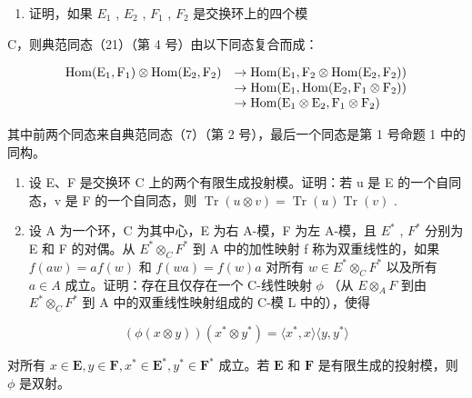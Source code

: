 \begin{enumerate}
\def\labelenumi{\arabic{enumi}.}
\setcounter{enumi}{6}
\tightlist
\item
  证明，如果 \(E_{1}\) , \(E_{2}\) , \(F_{1}\) , \(F_{2}\) 是交换环上的四个模
\end{enumerate}

C，则典范同态（21）（第 4 号）由以下同态复合而成：

\[
\begin{array}{r l} \operatorname{Hom} (\mathrm{E} _ {1}, \mathrm{F} _ {1}) \otimes \operatorname{Hom} (\mathrm{E} _ {2}, \mathrm{F} _ {2}) & \to \operatorname{Hom} (\mathrm{E} _ {1}, \mathrm{F} _ {2} \otimes \operatorname{Hom} (\mathrm{E} _ {2}, \mathrm{F} _ {2})) \\ & \to \operatorname{Hom} (\mathrm{E} _ {1}, \operatorname{Hom} (\mathrm{E} _ {2}, \mathrm{F} _ {1} \otimes \mathrm{F} _ {2})) \\ & \to \operatorname{Hom} (\mathrm{E} _ {1} \otimes \mathrm{E} _ {2}, \mathrm{F} _ {1} \otimes \mathrm{F} _ {2}) \end{array}
\]

其中前两个同态来自典范同态（7）（第 2 号），最后一个同态是第 1 号命题 1 中的同构。

\begin{enumerate}
\def\labelenumi{\arabic{enumi}.}
\setcounter{enumi}{7}
\item
  设 E、F 是交换环 C 上的两个有限生成投射模。证明：若 u 是 E 的一个自同态，v 是 F 的一个自同态，则 \(\operatorname{Tr}(u \otimes v) = \operatorname{Tr}(u)\operatorname{Tr}(v)\) .
\item
  设 A 为一个环，C 为其中心，E 为右 A-模，F 为左 A-模，且 \(E^{*}\) , \(F^{*}\) 分别为 E 和 F 的对偶。从 \(E^{*} \otimes_{C} F^{*}\) 到 A 中的加性映射 f 称为双重线性的，如果 \(f(aw) = af(w)\) 和 \(f(wa) = f(w)a\) 对所有 \(w \in E^{*} \otimes_{C} F^{*}\) 以及所有 \(a \in A\) 成立。证明：存在且仅存在一个 C-线性映射 \(\phi\) （从 \(E \otimes_{A} F\) 到由 \(E^{*} \otimes_{C} F^{*}\) 到 A 中的双重线性映射组成的 C-模 L 中的），使得
\end{enumerate}

\[
(\phi (x \otimes y)) (x ^ {*} \otimes y ^ {*}) = \langle x ^ {*}, x \rangle \langle y, y ^ {*} \rangle
\]

对所有 \(x \in \mathbf{E}, y \in \mathbf{F}, x^{*} \in \mathbf{E}^{*}, y^{*} \in \mathbf{F}^{*}\) 成立。若 \(\mathbf{E}\) 和 \(\mathbf{F}\) 是有限生成的投射模，则 \(\phi\) 是双射。

